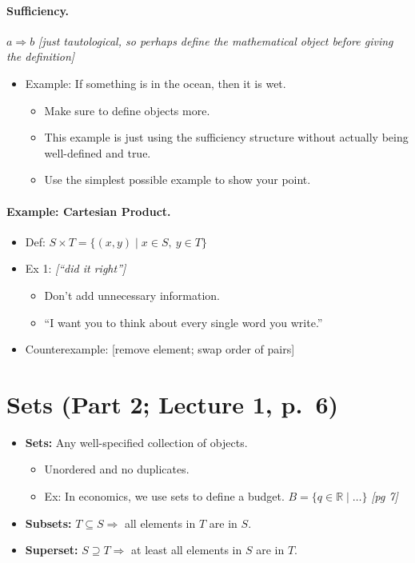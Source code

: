 \documentclass[11pt]{article}
\newcommand{\note}[1]{\textcolor{red!60!black}{\textit{[#1]}}}
\newcommand{\R}{\mathbb{R}}
\begin{document}
\paragraph{Sufficiency.} $a \Rightarrow b$ \quad \note{just tautological, so perhaps define the mathematical object before giving the definition}
\begin{itemize}
  \item Example: If something is in the ocean, then it is wet.
  \begin{itemize}
    \item Make sure to define objects more.
    \item This example is just using the sufficiency structure without actually being well-defined and true.
    \item Use the simplest possible example to show your point.
  \end{itemize}
\end{itemize}

\paragraph{Example: Cartesian Product.}
\begin{itemize}
  \item Def: $S \times T = \{(x,y) \mid x \in S,\ y \in T\}$
  \item Ex 1: \note{``did it right''}
  \begin{itemize}
    \item Don't add unnecessary information.
    \item ``I want you to think about every single word you write.''
  \end{itemize}
  \item Counterexample: [remove element; swap order of pairs]
\end{itemize}

\section{Sets (Part 2; Lecture 1, p.~6)}

\begin{itemize}
  \item \textbf{Sets:} Any well-specified collection of objects.
  \begin{itemize}
    \item Unordered and no duplicates.
    \item Ex: In economics, we use sets to define a budget. $B = \{q \in \R \mid \ldots\}$ \note{pg 7}
  \end{itemize}
  \item \textbf{Subsets:} $T \subseteq S \Rightarrow$ all elements in $T$ are in $S$.
  \item \textbf{Superset:} $S \supseteq T \Rightarrow$ at least all elements in $S$ are in $T$.
\end{itemize}
\end{document}
